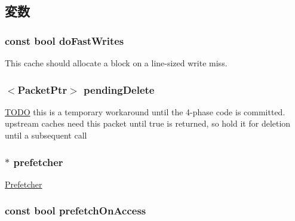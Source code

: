 \subsection{変数}
\hypertarget{classCache_a9b589ab6323a2796b7ae762dc7236bb5}{
\subsubsection[{doFastWrites}]{\setlength{\rightskip}{0pt plus 5cm}const bool {\bf doFastWrites}}}
\label{classCache_a9b589ab6323a2796b7ae762dc7236bb5}
This cache should allocate a block on a line-\/sized write miss. \hypertarget{classCache_a21da4bea3554874b557428e4cce5d4a4}{
\subsubsection[{pendingDelete}]{$<${\bf PacketPtr}$>$ {\bf pendingDelete}}}
\label{classCache_a21da4bea3554874b557428e4cce5d4a4}
\begin{Desc}
\item[\hyperlink{todo__todo000074}{TODO}]this is a temporary workaround until the 4-\/phase code is committed. upstream caches need this packet until true is returned, so hold it for deletion until a subsequent call \end{Desc}
\hypertarget{classCache_a320f5a2352104b9b633113f9045461a3}{
\subsubsection[{prefetcher}]{$\ast$ {\bf prefetcher}}}
\label{classCache_a320f5a2352104b9b633113f9045461a3}
\hyperlink{classPrefetcher}{Prefetcher} \hypertarget{classCache_a146f074bf7af4a70fc378862eab0b15a}{
\subsubsection[{prefetchOnAccess}]{\setlength{\rightskip}{0pt plus 5cm}const bool {\bf prefetchOnAccess}}}
